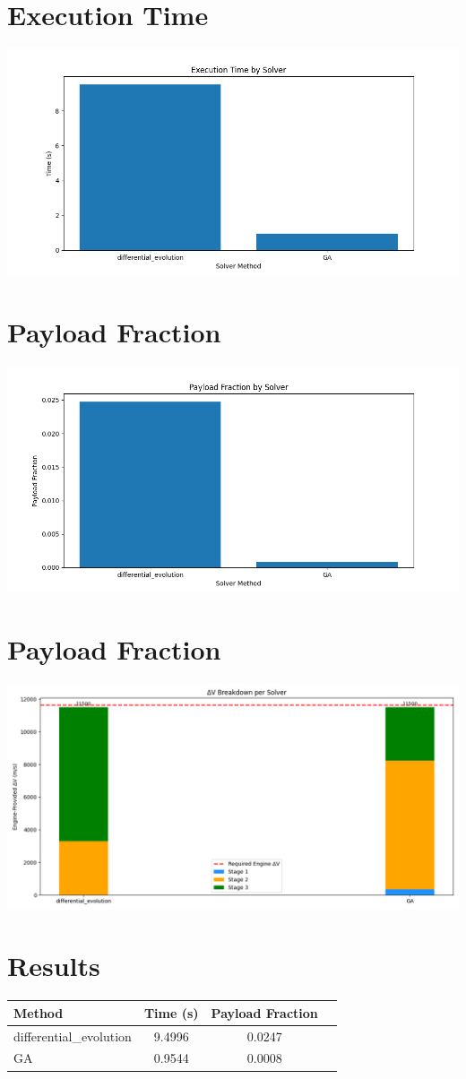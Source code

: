 \documentclass{article}
\begin{document}
\section{Execution Time}
\includegraphics[width=\textwidth]{execution_time.png}

\section{Payload Fraction}
\includegraphics[width=\textwidth]{payload_fraction.png}
                
\section{Payload Fraction}
\includegraphics[width=\textwidth]{dv_breakdown.png}

\section{Results}
\begin{tabular}{lccc}
\hline
Method & Time (s) & Payload Fraction \\
\hline
differential_evolution & 9.4996 & 0.0247 \\
GA & 0.9544 & 0.0008 \\

\hline
\end{tabular}
\end{document}
